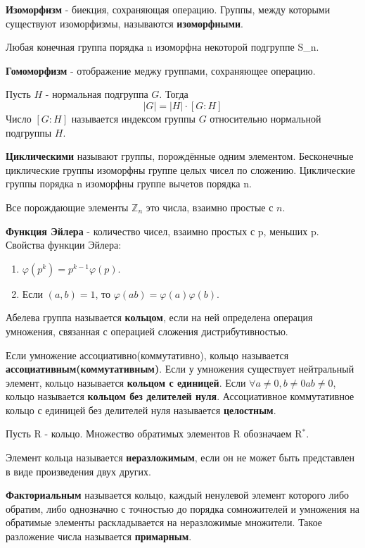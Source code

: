 \documentclass[11pt]{article}
\newcounter{th}\setcounter{th}{0}
\def\th{\par\smallskip\refstepcounter{th}\textbf{\arabic{th}}}
\newtheorem*{Theorem}{Теорема \th}
\begin{document}
\textbf{Изоморфизм} - биекция, сохраняющая операцию. Группы, между которыми существуют изоморфизмы,
называются \textbf{изоморфными}.

\begin{Theorem}
Любая конечная группа порядка n изоморфна некоторой подгруппе S_n.
\end{Theorem}

\textbf{Гомоморфизм} - отображение меджу группами, сохраняющее операцию.

\begin{Theorem}
Пусть $H$ - нормальная подгруппа $G$. Тогда
$$|G| = |H| \cdot [G: H]$$
Число $[G: H]$ называется индексом группы $G$ относительно нормальной подгруппы $H$.
\end{Theorem}

\textbf{Циклическими} называют группы, порождённые одним элементом. Бесконечные циклические группы изоморфны
группе целых чисел по сложению. Циклические группы порядка n изоморфны группе вычетов порядка n.

Все порождающие элементы \(\mathbb{Z}_n\) это числа, взаимно простые с \(n\).

\textbf{Функция Эйлера} - количество чисел, взаимно простых с p, меньших p.
Свойства функции Эйлера:
\begin{enumerate}
\item \(\varphi(p^k) = p^{k - 1}\varphi(p)\).
\item Если \((a, b) = 1\), то \(\varphi(ab) = \varphi(a)\varphi(b)\).
\end{enumerate}

Абелева группа называется \textbf{кольцом}, если на ней определена операция умножения, связанная
с операцией сложения дистрибутивностью.

Если умножение ассоциативно(коммутативно), кольцо называется \textbf{ассоциативным(коммутативным)}.
Если у умножения существует нейтральный элемент, кольцо называется \textbf{кольцом с единицей}.
Если \(\forall a \neq 0, b \neq 0 ab \neq 0\), кольцо называется \textbf{кольцом без делителей нуля}.
Ассоциативное коммутативное кольцо с единицей без делителей нуля называется \textbf{целостным}.

Пусть R - кольцо.
Множество обратимых элементов R обозначаем R\(^{\text{*}}\).

Элемент кольца называется \textbf{неразложимым}, если он не может быть представлен в виде произведения двух других.

\textbf{Факториальным} называется кольцо, каждый ненулевой элемент которого либо обратим, либо однозначно
с точностью до порядка сомножителей и умножения на обратимые элементы раскладывается на неразложимые
множители. Такое разложение числа называется \textbf{примарным}.
\end{document}
